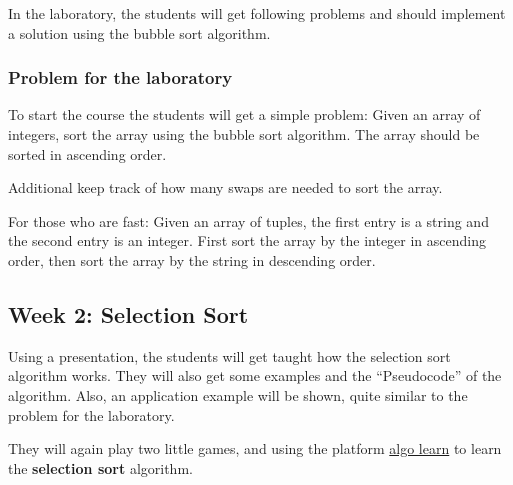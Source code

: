 \documentclass[10pt, oneside]{article}
\theoremstyle{remark}
\begin{document}
In the laboratory, the students will get following problems and should implement a solution using the bubble sort algorithm.

\subsubsection*{Problem for the laboratory}
\begin{tcolorbox}
  To start the course the students will get a simple problem: Given an array of integers, sort the array using the bubble sort algorithm. The array should be sorted in ascending order. 
  
  \vspace{1em}
  
  Additional keep track of how many swaps are needed to sort the array.
  
  \vspace{1em}
  
  For those who are fast: Given an array of tuples, the first entry is a string and the second entry is an integer. First sort the array by the integer in ascending order, then sort the array by the string in descending order.
\end{tcolorbox}

\subsection{Week 2: Selection Sort}
Using a presentation, the students will get taught how the selection sort algorithm works. They will also get some examples and the \enquote{Pseudocode} of the algorithm. Also, an application example will be shown, quite similar to the problem for the laboratory. 

They will again play two little games,  and using the platform \href{https://tcs.uni-frankfurt.de/algo-learn-testing/refs_heads_feat-bubbleSort/en
}{algo learn} to learn the \textbf{selection sort} algorithm. 
\end{document}
